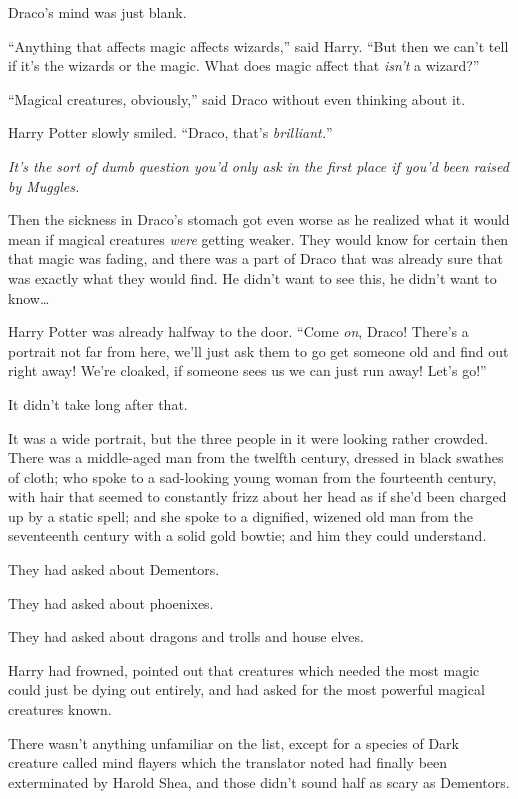 Draco’s mind was just blank.

“Anything that affects magic affects wizards,” said Harry. “But then we can’t
tell if it’s the wizards or the magic. What does magic affect that \emph{isn’t}
a wizard?”

“Magical creatures, obviously,” said Draco without even thinking about it.

Harry Potter slowly smiled. “Draco, that’s \emph{brilliant.}”

\emph{It’s the sort of dumb question you’d only ask in the first place if you’d
been raised by Muggles.}

Then the sickness in Draco’s stomach got even worse as he realized what it
would mean if magical creatures \emph{were} getting weaker. They would know for
certain then that magic was fading, and there was a part of Draco that was
already sure that was exactly what they would find. He didn’t want to see this,
he didn’t want to know…

Harry Potter was already halfway to the door. “Come \emph{on}, Draco! There’s a
portrait not far from here, we’ll just ask them to go get someone old and find
out right away! We’re cloaked, if someone sees us we can just run away! Let’s
go!”

\later

It didn’t take long after that.

It was a wide portrait, but the three people in it were looking rather crowded.
There was a middle-aged man from the twelfth century, dressed in black swathes
of cloth; who spoke to a sad-looking young woman from the fourteenth century,
with hair that seemed to constantly frizz about her head as if she’d been
charged up by a static spell; and she spoke to a dignified, wizened old man
from the seventeenth century with a solid gold bowtie; and him they could
understand.

They had asked about Dementors.

They had asked about phoenixes.

They had asked about dragons and trolls and house elves.

Harry had frowned, pointed out that creatures which needed the most magic could
just be dying out entirely, and had asked for the most powerful magical
creatures known.

There wasn’t anything unfamiliar on the list, except for a species of Dark
creature called mind flayers which the translator noted had finally been
exterminated by Harold Shea, and those didn’t sound half as scary as Dementors.

